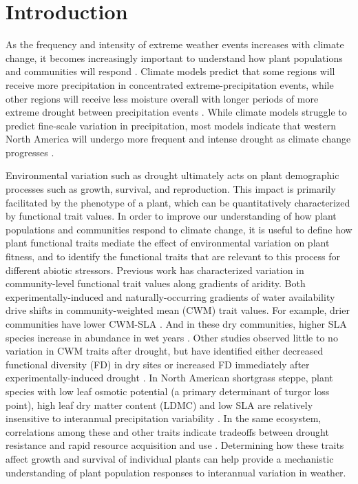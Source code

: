 \documentclass[12pt, letterpaper]{article}
\begin{document}
\section{Introduction}
As the frequency and intensity of extreme weather events increases with climate change, it becomes increasingly important to understand how plant populations and communities will respond \citep{Vicente-Serrano2020AWarming}. Climate models predict that some regions will receive more precipitation in concentrated extreme-precipitation events, while other regions will receive less moisture overall with longer periods of more extreme drought between precipitation events \citep{Knapp2008ConsequencesEcosystems}. While climate models struggle to predict fine-scale variation in precipitation, most models indicate that western North America will undergo more frequent and intense drought as climate change progresses \citep{Hartmann2013}.

Environmental variation such as drought ultimately acts on plant demographic processes such as growth, survival, and reproduction. This impact is primarily facilitated by the phenotype of a plant, which can be quantitatively characterized by functional trait values. In order to improve our understanding of how plant populations and communities respond to climate change, it is useful to define how plant functional traits mediate the effect of environmental variation on plant fitness, and to identify the functional traits that are relevant to this process for different abiotic stressors. Previous work has characterized variation in community-level functional trait values along gradients of aridity. Both experimentally-induced and naturally-occurring gradients of water availability drive shifts in community-weighted mean (CWM) trait values. For example, drier communities have lower CWM-SLA \citep{Nunes2017WhichDrylands, Cornwell2009CommunityCalifornia}. And in these dry communities, higher SLA species increase in abundance in wet years \citep{Wilcox2020PlantPrairie}. Other studies observed little to no variation in CWM traits after drought, but have identified either decreased functional diversity (FD) in dry sites \citep{Luo2019LongGrasslands}or increased FD immediately after experimentally-induced drought \citep{Griffin-Nolan2019}. In North American shortgrass steppe, plant species with low leaf osmotic potential (a primary determinant of turgor loss point), high leaf dry matter content (LDMC) and low SLA are relatively insensitive to interannual precipitation variability \citep{Wilcox2020PlantPrairie}. In the same ecosystem, correlations among these and other traits indicate tradeoffs between drought resistance and rapid resource acquisition and use \citep{Blumenthal2020}. Determining how these traits affect growth and survival of individual plants can help provide a mechanistic understanding of plant population responses to interannual variation in weather.
\end{document}
